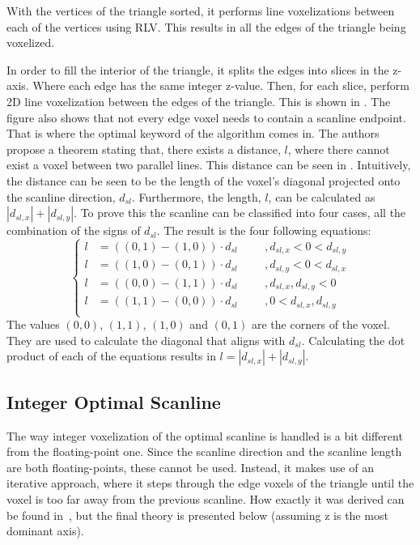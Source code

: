 With the vertices of the triangle sorted, it performs line voxelizations between each of the vertices using RLV.
This results in all the edges of the triangle being voxelized.

In order to fill the interior of the triangle, it splits the edges into slices in the z-axis.
Where each edge has the same integer z-value.
Then, for each slice, perform 2D line voxelization between the edges of the triangle.
This is shown in .
The figure also shows that not every edge voxel needs to contain a scanline endpoint.
That is where the optimal keyword of the algorithm comes in.
The authors propose a theorem stating that, there exists a distance, $l$, where there cannot exist a voxel between two parallel lines.
This distance can be seen in .
Intuitively, the distance can be seen to be the length of the voxel's diagonal projected onto the scanline direction, $d_{sl}$.
Furthermore, the length, $l$, can be calculated as $|d_{sl,x}| + |d_{sl,y}|$.
To prove this the scanline can be classified into four cases, all the combination of the signs of $d_{sl}$. The result is the four following equations:
\begin{equation*}
\left\{
\begin{aligned}
  l &= ((0,1) - (1,0)) \cdot d_{sl}\hspace{1cm},d_{sl,x} < 0 < d_{sl,y}\\
  l &= ((1,0) - (0,1)) \cdot d_{sl}\hspace{1cm},d_{sl,y} < 0 < d_{sl,x}\\
  l &= ((0,0) - (1,1)) \cdot d_{sl}\hspace{1cm},d_{sl,x}, d_{sl,y} < 0\\
  l &= ((1,1) - (0,0)) \cdot d_{sl}\hspace{1cm},0 < d_{sl,x}, d_{sl,y}\\
\end{aligned}
\right.
\end{equation*}
The values $(0,0)$, $(1,1)$, $(1,0)$ and $(0,1)$ are the corners of the voxel.
They are used to calculate the diagonal that aligns with $d_{sl}$.
Calculating the dot product of each of the equations results in $l = |d_{sl,x}| + |d_{sl,y}|$.




\newpage

\subsection{Integer Optimal Scanline}\label{ss:integer-optimal-scanline}
The way integer voxelization of the optimal scanline is handled is a bit different from the floating-point one. 
Since the scanline direction and the scanline length are both floating-points, these cannot be used.
Instead, it makes use of an iterative approach, where it steps through the edge voxels of the triangle until the voxel is too far away from the previous scanline. 
How exactly it was derived can be found in~\cite{scanline-voxelization}, but the final theory is presented below (assuming z is the most dominant axis).

